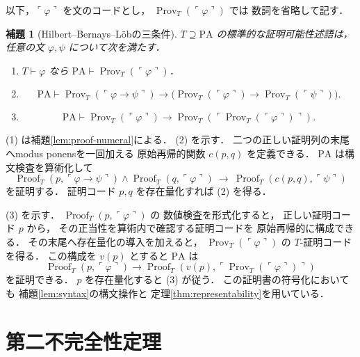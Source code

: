 \documentclass[a5paper,10pt,onecolumn]{jsarticle}
\makeatletter
\theoremstyle{mathnotetheorem}
\newtheorem{lemma}[theorem]{補題}
\renewcommand{\proofname}{証明}
\renewenvironment{proof}[1][\proofname]{%
  \par\pushQED{\qed}\normalfont\topsep4\p@\@plus2\p@\relax
  \trivlist\item[\hskip\labelsep\bfseries #1]\ignorespaces
}{\popQED\endtrivlist\@endpefalse}
\makeatother
\begin{document}
以下，$\ulcorner\varphi\urcorner$ を文のコードとし，
$\operatorname{Prov}_T(\ulcorner\varphi\urcorner)$ では
数詞を省略して記す．

\begin{lemma}[Hilbert--Bernays--L\"obの三条件]
\label{lem:derivability}
$T\supseteq\mathrm{PA}$ の標準的な証明可能性述語は，
任意の文 $\varphi,\psi$ について次を満たす．
\begin{enumerate}
\item $T\vdash\varphi$ なら
 $\mathrm{PA}\vdash\operatorname{Prov}_T(\ulcorner\varphi\urcorner)$．
\item
 \[
 \mathrm{PA}\vdash\operatorname{Prov}_T(
 \ulcorner\varphi\to\psi\urcorner)\to
 \bigl(\operatorname{Prov}_T(\ulcorner\varphi\urcorner)
 \to\operatorname{Prov}_T(\ulcorner\psi\urcorner)\bigr).
 \]
\item
 \[
 \mathrm{PA}\vdash\operatorname{Prov}_T(\ulcorner\varphi\urcorner)
 \to\operatorname{Prov}_T(
 \ulcorner\operatorname{Prov}_T(\ulcorner\varphi\urcorner)\urcorner).
 \]
\end{enumerate}
\end{lemma}
\begin{proof}
(1) は補題\ref{lem:proof-numeral}による．
(2) を示す．
二つの正しい証明列の末尾へmodus ponensを一回加える
原始再帰的関数 $c(p,q)$ を定義できる．
$\mathrm{PA}$ は構文検査を算術化して
\[
 \operatorname{Proof}_T(p,\ulcorner\varphi\to\psi\urcorner)
 \land\operatorname{Proof}_T(q,\ulcorner\varphi\urcorner)
 \ \to\
 \operatorname{Proof}_T(c(p,q),\ulcorner\psi\urcorner)
\]
を証明する．
証明コード $p,q$ を存在量化すれば (2) を得る．

(3) を示す．
$\operatorname{Proof}_T(p,\ulcorner\varphi\urcorner)$ の
数値検査を形式化すると，
正しい証明コード $p$ から，
その正当性を算術内で確認する証明コードを
原始再帰的に構成できる．
その末尾へ存在量化の導入を加えると，
$\operatorname{Prov}_T(\ulcorner\varphi\urcorner)$ の
$T$-証明コードを得る．
この構成を $v(p)$ とすると
$\mathrm{PA}$ は
\[
 \operatorname{Proof}_T(p,\ulcorner\varphi\urcorner)
 \to\operatorname{Proof}_T(
 v(p),
 \ulcorner\operatorname{Prov}_T(
 \ulcorner\varphi\urcorner)\urcorner)
\]
を証明できる．
$p$ を存在量化すると (3) が従う．
この証明書の符号化においても
補題\ref{lem:syntax}の構文操作と
定理\ref{thm:representability}を用いている．
\end{proof}

\section{第二不完全性定理}
\end{document}
